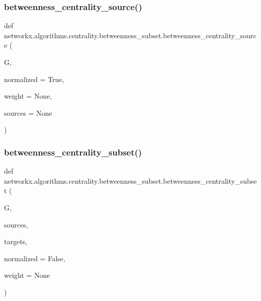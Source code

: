 \subsubsection{\texorpdfstring{betweenness\+\_\+centrality\+\_\+source()}{betweenness\_centrality\_source()}}
{\footnotesize\ttfamily def networkx.\+algorithms.\+centrality.\+betweenness\+\_\+subset.\+betweenness\+\_\+centrality\+\_\+source (\begin{DoxyParamCaption}\item[{}]{G,  }\item[{}]{normalized = {\ttfamily True},  }\item[{}]{weight = {\ttfamily None},  }\item[{}]{sources = {\ttfamily None} }\end{DoxyParamCaption})}

\mbox{\label{namespacenetworkx_1_1algorithms_1_1centrality_1_1betweenness__subset_a31c9a70b652f71393eb4c0602c41c230}} 
\subsubsection{\texorpdfstring{betweenness\+\_\+centrality\+\_\+subset()}{betweenness\_centrality\_subset()}}
{\footnotesize\ttfamily def networkx.\+algorithms.\+centrality.\+betweenness\+\_\+subset.\+betweenness\+\_\+centrality\+\_\+subset (\begin{DoxyParamCaption}\item[{}]{G,  }\item[{}]{sources,  }\item[{}]{targets,  }\item[{}]{normalized = {\ttfamily False},  }\item[{}]{weight = {\ttfamily None} }\end{DoxyParamCaption})}

